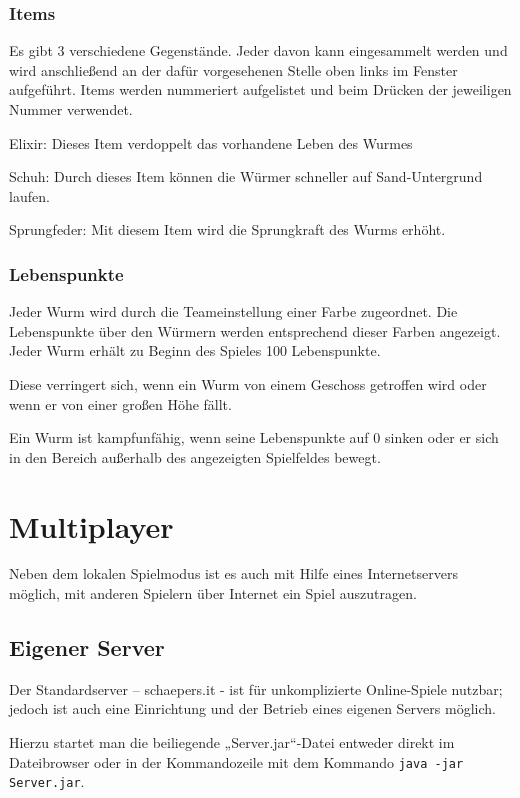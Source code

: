 \documentclass{scrreprt}
\begin{document}
\subsection{Items}

Es gibt 3 verschiedene Gegenstände. Jeder davon kann eingesammelt werden und wird anschließend an der dafür vorgesehenen Stelle oben links im Fenster aufgeführt.
Items werden nummeriert aufgelistet und beim Drücken der jeweiligen Nummer verwendet. 

Elixir: Dieses Item verdoppelt das vorhandene Leben des Wurmes

Schuh: Durch dieses Item können die Würmer schneller auf Sand-Untergrund laufen.

Sprungfeder: Mit diesem Item wird die Sprungkraft des Wurms erhöht.

\subsection{Lebenspunkte}

Jeder Wurm wird durch die Teameinstellung einer Farbe zugeordnet. Die Lebenspunkte über den Würmern werden entsprechend dieser Farben angezeigt.
Jeder Wurm erhält zu Beginn des Spieles 100 Lebenspunkte.

Diese verringert sich, wenn ein Wurm von einem Geschoss getroffen wird oder wenn er von einer großen Höhe fällt.

Ein Wurm ist kampfunfähig, wenn seine Lebenspunkte auf 0 sinken oder er sich in den Bereich außerhalb des angezeigten Spielfeldes bewegt.

\chapter{Multiplayer}
\label{Multiplayer} 

Neben dem lokalen Spielmodus ist es auch mit Hilfe eines Internetservers möglich, mit anderen Spielern über Internet ein Spiel auszutragen.

\section{Eigener Server}

Der Standardserver – schaepers.it - ist für unkomplizierte Online-Spiele nutzbar; jedoch ist auch eine Einrichtung und der Betrieb eines eigenen Servers möglich.

Hierzu startet man die beiliegende „Server.jar“-Datei entweder direkt im Dateibrowser oder in der Kommandozeile mit dem Kommando
\texttt{java -jar Server.jar}.
\end{document}
